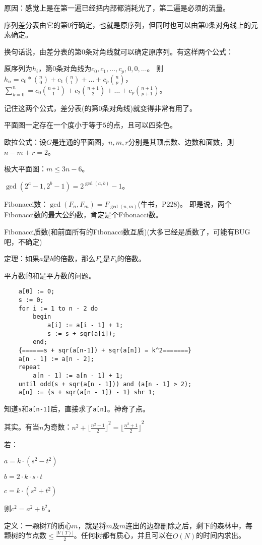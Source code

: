 \documentclass{article}
\begin{document}
原因：感觉上是在第一遍已经把内部都消耗光了，第二遍是必须的流量。

序列差分表由它的第$0$行确定，也就是原序列，但同时也可以由第$0$条对角线上的元素确定。

换句话说，由差分表的第$0$条对角线就可以确定原序列。有这样两个公式：

原序列为$h_i$，第$0$条对角线为$c_0,c_1,\ldots,c_p,0,0,\ldots$。
则$h_n=c_0*\binom{n}{0}+c_1\binom{n}{1}+\ldots+c_p\binom{n}{p}$，
$\sum_{k=0}^{n}=c_0\binom{n+1}{1}+c_2\binom{n+1}{2}+\ldots+c_p\binom{n+1}{p+1}$。

记住这两个公式，差分表(的第$0$条对角线)就变得非常有用了。

平面图一定存在一个度小于等于$5$的点，且可以四染色。

欧拉公式：设$G$是连通的平面图，$n,m,r$分别是其顶点数、边数和面数，则$n-m+r=2$。

极大平面图：$m\le3n-6$。

$\gcd(2^a-1,2^b-1)=2^{\gcd(a,b)}-1$。

Fibonacci数：$\gcd(F_n,F_m)=F_{\gcd(n,m)}$(牛书，P228)。
即是说，两个Fibonacci数的最大公约数，肯定是个Fibonacci数。

Fibonacci质数(和前面所有的Fibonacci数互质)(大多已经是质数了，可能有BUG吧，不确定)

定理：如果$a$是$b$的倍数，那么$F_a$是$F_b$的倍数。

平方数的和是平方数的问题。

\begin{verbatim}
    a[0] := 0;
    s := 0;
    for i := 1 to n - 2 do
        begin
            a[i] := a[i - 1] + 1;
            s := s + sqr(a[i]);
        end;
    {======s + sqr(a[n-1]) + sqr(a[n]) = k^2=======}
    a[n - 1] := a[n - 2];
    repeat
        a[n - 1] := a[n - 1] + 1;
    until odd(s + sqr(a[n - 1])) and (a[n - 1] > 2);
    a[n] := (s + sqr(a[n - 1]) - 1) shr 1;
\end{verbatim}

知道\texttt{s}和\texttt{a[n-1]}后，直接求了\texttt{a[n]}。神奇了点。

其实。有当$n$为奇数：$n^2+{\lfloor\frac{n^2-1}{2}\rfloor}^2={\lfloor\frac{n^2+1}{2}\rfloor}^2$

若：

$a=k\cdot(s^2 - t^2)$

$b=2\cdot k\cdot s\cdot t$

$c=k\cdot(s^2 + t^2)$

则$c^2=a^2+b^2$。

定义：一颗树$T$的质心$m$，就是将$m$及$m$连出的边都删除之后，剩下的森林中，每颗树的节点数$\le \frac{|V(T)|}{2}$。任何树都有质心，并且可以在$O(N)$的时间内求出。
\end{document}
